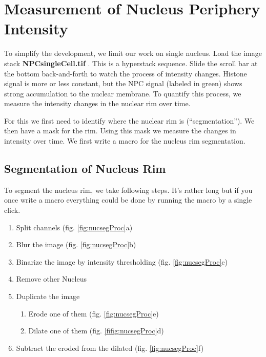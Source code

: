 \section{Measurement of Nucleus Periphery Intensity}

To simplify the development, we limit our work on single nucleus. Load the image stack \textbf{NPCsingleCell.tif} . This is a hyperstack sequence. Slide the scroll bar at the bottom back-and-forth to watch the process of intensity changes. Histone signal is more or less constant, but the NPC signal (labeled in green) shows strong accumulation to the nuclear membrane. To quantify this process, we measure the intensity changes in the nuclear rim over time.

For this we first need to identify where the nuclear rim is (``segmentation''). We then have a mask for the rim. Using this mask we measure the changes in intensity over time. We first write a macro for the nucleus rim segmentation.

\subsection{Segmentation of Nucleus Rim}

To segment the nucleus rim, we take following steps. It's rather long but if you once write a macro everything could be done by running the macro by a single click.

\begin{enumerate}
  \item Split channels (fig. \ref{fig:nucsegProc}a)
  \item Blur the image (fig. \ref{fig:nucsegProc}b)
  \item Binarize the image by intensity thresholding (fig. \ref{fig:nucsegProc}c)
  \item Remove other Nucleus
  \item Duplicate the image
  \begin{enumerate}
    \item Erode one of them (fig. \ref{fig:nucsegProc}e)
    \item Dilate one of them (fig. \ref{fifig:nucsegProc}d)
  \end{enumerate}
  \item Subtract the eroded from the dilated (fig. \ref{fig:nucsegProc}f)
\end{enumerate}